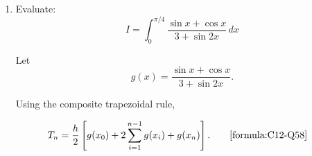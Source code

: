 \begin{enumerate}[label=\thesubsection.\arabic*, ref=\thesubsection.\theenumi]
Let
\[
f(x)=\frac{\cos^2 x}{1+3\sin^2 x}.
\]

Using the composite trapezoidal rule,

\begin{align*}
    T_n &= \frac{h}{2}\left[
    f(x_0)+2\sum_{i=1}^{n-1}f(x_i)+f(x_n)
    \right].
    \tag*{\eqref{formula:C12-Q58}}
\end{align*}

Taking $n=4$,

\[
h=\frac{\pi/2-0}{4}=\frac{\pi}{8}.
\]

The function values are

\[
\begin{array}{c|c}
x_i & f(x_i)\\ \hline
0 & 1.000000\\
\pi/8 & 0.593017\\
\pi/4 & 0.200000\\
3\pi/8 & 0.041129\\
\pi/2 & 0.000000
\end{array}
\]

Therefore,

\begin{align*}
    T_4 &= \frac{\pi}{8}\left[
    \frac12(1)+0.593017+0.200000
    +0.041129+\frac12(0)\right]\\
    &= 0.523918.
\end{align*}

    The following code verifies the solution.

    \begin{lstlisting}[frame=single, basicstyle=\rmfamily, escapeinside={(*@}{@*)}]
(*@\makebox[\dimexpr\linewidth-2\fboxsep-2\fboxrule\relax][c]{12/codes/Q61.py}@*)
    \end{lstlisting}


\item
\label{question:C12-Q59}
\label{question-short:C12-Q59} Evaluate:
\[
I=\int_0^{\pi/4}
\frac{\sin x+\cos x}{3+\sin 2x}\,dx
\]

\par
\smallskip
\solution

Let
\[
g(x)=\frac{\sin x+\cos x}{3+\sin 2x}.
\]

Using the composite trapezoidal rule,

\begin{align*}
    T_n &= \frac{h}{2}\left[
    g(x_0)+2\sum_{i=1}^{n-1}g(x_i)+g(x_n)
    \right].
    \tag*{\eqref{formula:C12-Q58}}
\end{align*}


\end{enumerate}
